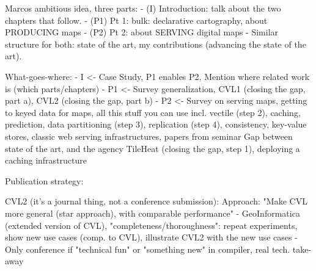 \documentclass[11pt, oneside]{report}   	%
\begin{document}
Marcos ambitious idea, three parts:
- (I) Introduction: talk about the two chapters that follow. 
- (P1) Pt 1: bulk: declarative cartography, about PRODUCING maps
- (P2) Pt 2: about SERVING digital maps
- Similar structure for both: state of the art, my contributions (advancing the state of the art).  

What-goes-where:
- I <- Case Study, P1 enables P2, Mention where related work is (which parts/chapters)
- P1 <- 
        Survey generalization, 
        CVL1 (closing the gap, part a), 
        CVL2 (closing the gap, part b)
- P2 <- 
        Survey on serving maps, getting to keyed data for maps, all this stuff you can use 
                incl. vectile (step 2),
                caching,
                prediction,
                data partitioning (step 3), 
                replication (step 4), 
                consistency, 
                key-value stores, 
                classic web serving infrastructures,
                papers from seminar
        Gap between state of the art, and the agency
        TileHeat (closing the gap, step 1), deploying a caching infrastructure
        
Publication strategy:

CVL2 (it's a journal thing, not a conference submission):
Approach: "Make CVL more general (star approach), with comparable performance"
- GeoInformatica (extended version of CVL), "completeness/thoroughness": repeat experiments, show new use cases (comp. to CVL), illustrate CVL2 with the new use cases 
- Only conference if "technical fun" or "something new" in compiler, real tech. take-away
\end{document}
